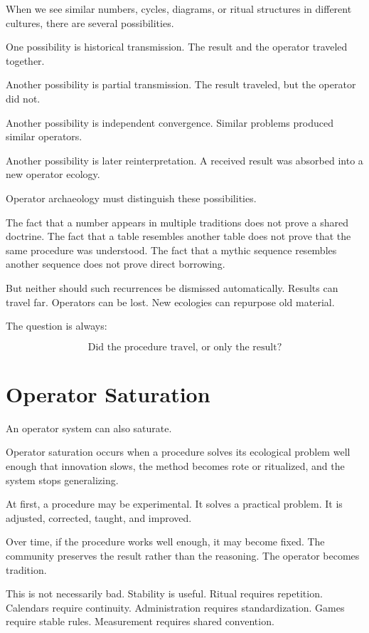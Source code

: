 \documentclass[11pt]{book}
\begin{document}
When we see similar numbers, cycles, diagrams, or ritual structures in different cultures, there are several possibilities.

One possibility is historical transmission. The result and the operator traveled together.

Another possibility is partial transmission. The result traveled, but the operator did not.

Another possibility is independent convergence. Similar problems produced similar operators.

Another possibility is later reinterpretation. A received result was absorbed into a new operator ecology.

Operator archaeology must distinguish these possibilities.

The fact that a number appears in multiple traditions does not prove a shared doctrine. The fact that a table resembles another table does not prove that the same procedure was understood. The fact that a mythic sequence resembles another sequence does not prove direct borrowing.

But neither should such recurrences be dismissed automatically. Results can travel far. Operators can be lost. New ecologies can repurpose old material.

The question is always:

\[
\text{Did the procedure travel, or only the result?}
\]

\section{Operator Saturation}

An operator system can also saturate.

Operator saturation occurs when a procedure solves its ecological problem well enough that innovation slows, the method becomes rote or ritualized, and the system stops generalizing.

At first, a procedure may be experimental. It solves a practical problem. It is adjusted, corrected, taught, and improved.

Over time, if the procedure works well enough, it may become fixed. The community preserves the result rather than the reasoning. The operator becomes tradition.

This is not necessarily bad. Stability is useful. Ritual requires repetition. Calendars require continuity. Administration requires standardization. Games require stable rules. Measurement requires shared convention.
\end{document}
